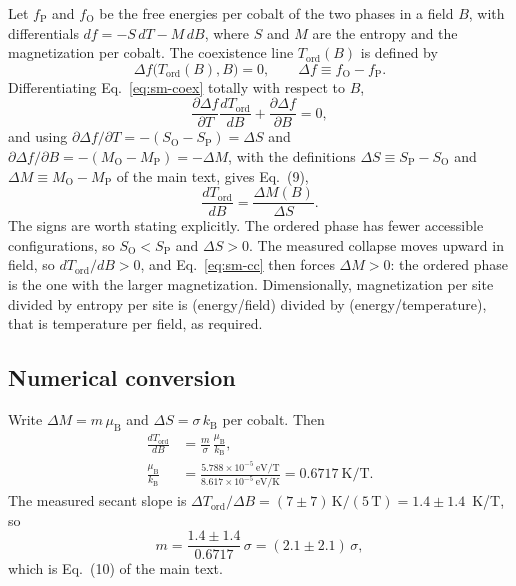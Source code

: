 \documentclass[reprint,twocolumn,prb,amsmath,amssymb,superscriptaddress,floatfix]{revtex4-2}
\newcommand{\kB}{k_{\mathrm{B}}}
\newcommand{\muBs}{\mu_{\mathrm{B}}}
\newcommand{\Tcol}{T_{\mathrm{ord}}}
\begin{document}
Let $f_{\mathrm{P}}$ and $f_{\mathrm{O}}$ be the free energies per cobalt of the two phases in a
field $B$, with differentials $df=-S\,dT-M\,dB$, where $S$ and $M$ are the entropy and the
magnetization per cobalt. The coexistence line $\Tcol(B)$ is defined by
\begin{equation}
  \Delta f\bigl(\Tcol(B),B\bigr)=0,
  \qquad \Delta f \equiv f_{\mathrm{O}}-f_{\mathrm{P}} .
  \label{eq:sm-coex}
\end{equation}
Differentiating Eq.~\eqref{eq:sm-coex} totally with respect to $B$,
\begin{equation}
  \frac{\partial\Delta f}{\partial T}\frac{d\Tcol}{dB}
  + \frac{\partial\Delta f}{\partial B} = 0,
  \label{eq:sm-total}
\end{equation}
and using $\partial\Delta f/\partial T=-(S_{\mathrm{O}}-S_{\mathrm{P}})=\Delta S$ and
$\partial\Delta f/\partial B=-(M_{\mathrm{O}}-M_{\mathrm{P}})=-\Delta M$, with the definitions
$\Delta S\equiv S_{\mathrm{P}}-S_{\mathrm{O}}$ and $\Delta M\equiv M_{\mathrm{O}}-M_{\mathrm{P}}$
of the main text, gives Eq.~(9),
\begin{equation}
  \frac{d\Tcol}{dB}=\frac{\Delta M(B)}{\Delta S}.
  \label{eq:sm-cc}
\end{equation}
The signs are worth stating explicitly. The ordered phase has fewer accessible configurations,
so $S_{\mathrm{O}}<S_{\mathrm{P}}$ and $\Delta S>0$. The measured collapse moves upward in
field, so $d\Tcol/dB>0$, and Eq.~\eqref{eq:sm-cc} then forces $\Delta M>0$: the ordered phase is
the one with the larger magnetization. Dimensionally, magnetization per site divided by entropy
per site is (energy/field) divided by (energy/temperature), that is temperature per field, as
required.

\subsection{Numerical conversion}

Write $\Delta M=m\,\muBs$ and $\Delta S=\sigma\,\kB$ per cobalt. Then
\begin{equation}
\begin{aligned}
  \frac{d\Tcol}{dB} &= \frac{m}{\sigma}\,\frac{\muBs}{\kB},\\[2pt]
  \frac{\muBs}{\kB} &= \frac{5.788\times10^{-5}\ \mathrm{eV/T}}
                           {8.617\times10^{-5}\ \mathrm{eV/K}}
   = 0.6717\ \mathrm{K/T} .
\end{aligned}
  \label{eq:sm-convert}
\end{equation}
The measured secant slope is $\Delta\Tcol/\Delta B=(7\pm7)\,\mathrm{K}/(5\,\mathrm{T})
=1.4\pm1.4$~K/T, so
\begin{equation}
  m = \frac{1.4\pm1.4}{0.6717}\,\sigma = (2.1\pm2.1)\,\sigma ,
  \label{eq:sm-dM}
\end{equation}
which is Eq.~(10) of the main text.
\end{document}
